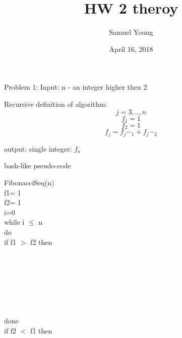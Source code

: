\documentclass[12pt]{article}
\author{Samuel Young}
\date{April 16, 2018}
\title{HW 2 theroy}
\begin{document}
\maketitle

Problem  1:
Input: n - an integer higher then 2

Recursive definition of algorithm:
$$j=3,..,n$$
$$f_1=1$$
$$f_2=1$$
$$f_j=f_j -_1+f_j -_2$$

output:
 single integer: $f_n$

bash-like pseudo-code

FibonacciSeq(n)\\

f1= 1\\

f2= 1\\

i=0\\

while i $\leq$ n\\

do \\

\hspace{1cm}  if f1 $>$ f2 then\\

\hspace{2cm}{f1 = f1 + f2}\\

\hspace{2cm}{f1}\\

\hspace{1cm}{else}\\ 

\hspace{2cm}{f2= f2 + f1}\\

\hspace{2cm}{f2}\\

\hspace{1cm}{fi}\\

\hspace{1cm}{i=1+i}\\

done\\

if f2 $<$ f1 then\\

\hspace{1cm}{return f1}\\
\end{document}
